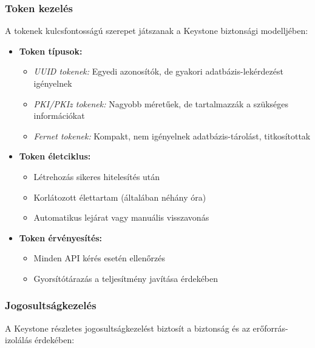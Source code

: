 \documentclass[a4paper,12pt]{article}
\begin{document}
    \subsubsection{Token kezelés}

    A tokenek kulcsfontosságú szerepet játszanak a Keystone biztonsági modelljében:

    \begin{itemize}
        \item \textbf{Token típusok:}
        \begin{itemize}
            \item \textit{UUID tokenek:} Egyedi azonosítók, de gyakori adatbázis-lekérdezést igényelnek
            \item \textit{PKI/PKIz tokenek:} Nagyobb méretűek, de tartalmazzák a szükséges információkat
            \item \textit{Fernet tokenek:} Kompakt, nem igényelnek adatbázis-tárolást, titkosítottak
        \end{itemize}

        \item \textbf{Token életciklus:}
        \begin{itemize}
            \item Létrehozás sikeres hitelesítés után
            \item Korlátozott élettartam (általában néhány óra)
            \item Automatikus lejárat vagy manuális visszavonás
        \end{itemize}

        \item \textbf{Token érvényesítés:}
        \begin{itemize}
            \item Minden API kérés esetén ellenőrzés
            \item Gyorsítótárazás a teljesítmény javítása érdekében
        \end{itemize}
    \end{itemize}

    \subsubsection{Jogosultságkezelés}

    A Keystone részletes jogosultságkezelést biztosít a biztonság és az erőforrás-izolálás érdekében:
\end{document}
